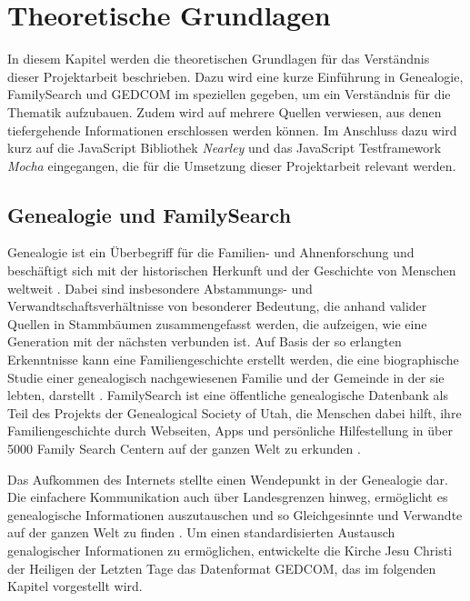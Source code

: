 \chapter{Theoretische Grundlagen}
\label{chap: Theoretische Grundlagen}
In diesem Kapitel werden die theoretischen Grundlagen für das Verständnis dieser Projektarbeit beschrieben. Dazu wird eine kurze Einführung in Genealogie, FamilySearch und GEDCOM im speziellen gegeben, um ein Verständnis für die Thematik aufzubauen. Zudem wird auf mehrere Quellen verwiesen, aus denen tiefergehende Informationen erschlossen werden können. Im Anschluss dazu wird kurz auf die JavaScript Bibliothek \textit{Nearley} und das JavaScript Testframework \textit{Mocha} eingegangen, die für die Umsetzung dieser Projektarbeit relevant werden.

\section{Genealogie und FamilySearch}
\label{sec: Genealogie und FamilySearch}
Genealogie ist ein Überbegriff für die Familien- und Ahnenforschung und beschäftigt sich mit der historischen Herkunft und der Geschichte von Menschen weltweit \cite{AhnenforschungDE}. Dabei sind insbesondere Abstammungs- und Verwandtschaftsverhältnisse von besonderer Bedeutung, die anhand valider Quellen in Stammbäumen zusammengefasst werden, die aufzeigen, wie eine Generation mit der nächsten verbunden ist. Auf Basis der so erlangten Erkenntnisse kann eine Familiengeschichte erstellt werden, die eine biographische Studie einer genealogisch nachgewiesenen Familie und der Gemeinde in der sie lebten, darstellt \cite{SocietyOfGenealogists}. FamilySearch ist eine öffentliche genealogische Datenbank als Teil des Projekts der Genealogical Society of Utah, die Menschen dabei hilft, ihre Familiengeschichte durch Webseiten, Apps und persönliche Hilfestellung in über 5000 Family Search Centern auf der ganzen Welt zu erkunden \cite{FamilySearchAbout}.

Das Aufkommen des Internets stellte einen Wendepunkt in der Genealogie dar. Die einfachere Kommunikation auch über Landesgrenzen hinweg, ermöglicht es genealogische Informationen auszutauschen und so Gleichgesinnte und Verwandte auf der ganzen Welt zu finden \cite{AhnenforschungDE}. Um einen standardisierten Austausch genalogischer Informationen zu ermöglichen, entwickelte die Kirche Jesu Christi der Heiligen der Letzten Tage das Datenformat GEDCOM, das im folgenden Kapitel vorgestellt wird.
\newpage
